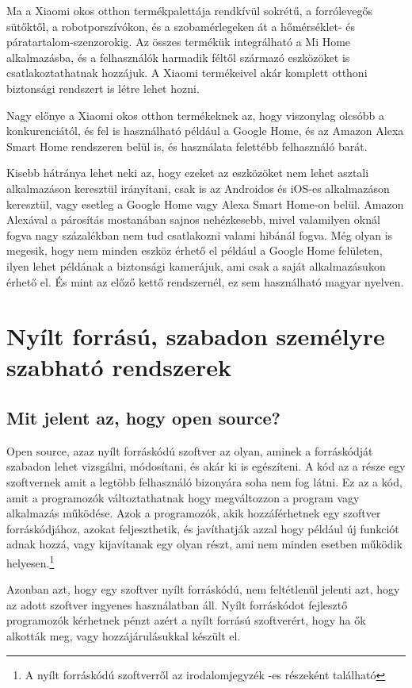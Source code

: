\documentclass[
]{thesis-ekf}
\theoremstyle{definition}
\theoremstyle{remark}
\begin{document}
	Ma a Xiaomi okos otthon termékpalettája rendkívül sokrétű, a forrólevegős sütőktől, a robotporszívókon, és a szobamérlegeken át a hőmérséklet- és páratartalom-szenzorokig. Az összes termékük integrálható a Mi Home alkalmazásba, és a felhasználók harmadik féltől származó eszközöket is csatlakoztathatnak hozzájuk. A Xiaomi termékeivel akár komplett otthoni biztonsági rendszert is létre lehet hozni.
	
	Nagy előnye a Xiaomi okos otthon termékeknek az, hogy viszonylag olcsóbb a konkurenciától, és fel is használható például a Google Home, és az Amazon Alexa Smart Home rendszeren belül is, és használata felettébb felhasználó barát.
	
	Kisebb hátránya lehet neki az, hogy ezeket az eszközöket nem lehet asztali alkalmazáson keresztül irányítani, csak is az Androidos és iOS-es alkalmazáson keresztül, vagy esetleg a Google Home vagy Alexa Smart Home-on belül. Amazon Alexával a párosítás mostanában sajnos nehézkesebb, mivel valamilyen oknál fogva nagy százalékban nem tud csatlakozni valami hibánál fogva. Még olyan is megesik, hogy nem minden eszköz érhető el például a Google Home felületen, ilyen lehet példának a biztonsági kamerájuk, ami csak a saját alkalmazásukon érhető el. És mint az előző kettő rendszernél, ez sem használható magyar nyelven.
	
	\section{Nyílt forrású, szabadon személyre szabható rendszerek}
	\subsection*{Mit jelent az, hogy open source?}
	
	Open source, azaz nyílt forráskódú szoftver az olyan, aminek a forráskódját szabadon lehet vizsgálni, módosítani, és akár ki is egészíteni. A kód az a része egy szoftvernek amit a legtöbb felhasználó bizonyára soha nem fog látni. Ez az a kód, amit a programozók változtathatnak hogy megváltozzon a program vagy alkalmazás működése. Azok a programozók, akik hozzáférhetnek egy szoftver forráskódjához, azokat feljeszthetik, és javíthatják azzal hogy például új funkciót adnak hozzá, vagy kijavítanak egy olyan részt, ami nem minden esetben működik helyesen.\footnote{\label{open-source-fn}A nyílt forráskódú szoftverről az irodalomjegyzék \cite{what-is-open-source}-es részeként található}
	
	Azonban azt, hogy egy szoftver nyílt forráskódú, nem feltétlenül jelenti azt, hogy az adott szoftver ingyenes használatban áll. Nyílt forráskódot fejlesztő programozók kérhetnek pénzt azért a nyílt forrású szoftverért, hogy ha ők alkották meg, vagy hozzájárulásukkal készült el. 
	
\end{document}

